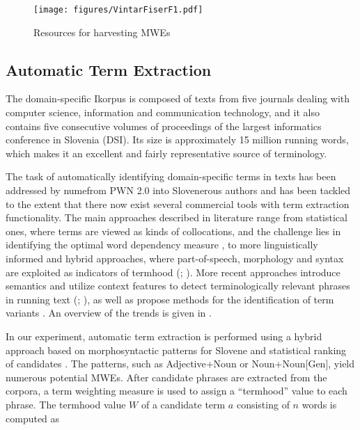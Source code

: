 \documentclass[output=paper]{LSP/langsci}
\begin{document}
\begin{figure}
\texttt{[image: figures/VintarFiserF1.pdf]}
\caption{Resources for harvesting MWEs}
\label{fig:vintar:1}
\end{figure}

\subsection{Automatic Term Extraction}\label{sec:vintar:3.3}

The domain-specific Ikorpus is composed of texts from five journals dealing with computer science, information and communication technology, and it also contains five consecutive volumes of proceedings of the largest informatics conference in Slovenia (DSI). Its size is approximately 15 million running words, which makes it an excellent and fairly representative source of terminology.

The task of automatically identifying domain-specific terms in texts has been addressed by numefrom PWN 2.0 into Slovenerous authors and has been tackled to the extent that there now exist several commercial tools with term extraction functionality. The main approaches described in literature range from statistical ones, where terms are viewed as kinds of collocations, and the challenge lies in identifying the optimal word dependency measure \citep{Dunning1993, Daille1995}, to more linguistically informed and hybrid approaches, where part-of-speech, morphology and syntax are exploited as indicators of termhood (\citealt{Heid1999}; \citealt{DiasEtAl2000}). More recent approaches introduce semantics and utilize context features to detect terminologically relevant phrases in running text (\citealt{Maynard1999}; \citealt{Gillam2007}), as well as propose methods for the identification of term variants \citep{Jacquemin2001}. An overview of the trends is given in \citet{KageuraEtAl2004}. 

In our experiment, automatic term extraction is performed using a hybrid approach based on morphosyntactic patterns for Slovene and statistical ranking of candidates \citep{Vintar2004, Vintar2009}. The patterns, such as Adjective+Noun or Noun+Noun[Gen], yield numerous potential MWEs. After candidate phrases are extracted from the corpora, a term weighting measure is used to assign a ``termhood'' value to each phrase. The termhood value $W$ of a candidate term $a$ consisting of $n$ words is computed as 
\end{document}
